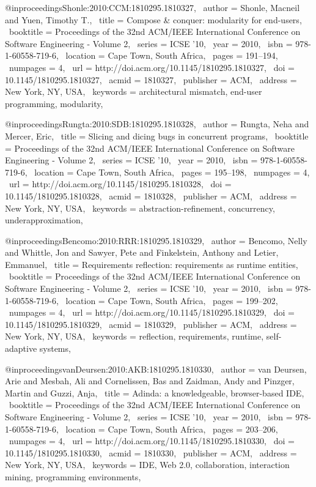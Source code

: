 @inproceedings{Shonle:2010:CCM:1810295.1810327,
 author = {Shonle, Macneil and Yuen, Timothy T.},
 title = {Compose \& conquer: modularity for end-users},
 booktitle = {Proceedings of the 32nd ACM/IEEE International Conference on Software Engineering - Volume 2},
 series = {ICSE '10},
 year = {2010},
 isbn = {978-1-60558-719-6},
 location = {Cape Town, South Africa},
 pages = {191--194},
 numpages = {4},
 url = {http://doi.acm.org/10.1145/1810295.1810327},
 doi = {10.1145/1810295.1810327},
 acmid = {1810327},
 publisher = {ACM},
 address = {New York, NY, USA},
 keywords = {architectural mismatch, end-user programming, modularity},
} 

@inproceedings{Rungta:2010:SDB:1810295.1810328,
 author = {Rungta, Neha and Mercer, Eric},
 title = {Slicing and dicing bugs in concurrent programs},
 booktitle = {Proceedings of the 32nd ACM/IEEE International Conference on Software Engineering - Volume 2},
 series = {ICSE '10},
 year = {2010},
 isbn = {978-1-60558-719-6},
 location = {Cape Town, South Africa},
 pages = {195--198},
 numpages = {4},
 url = {http://doi.acm.org/10.1145/1810295.1810328},
 doi = {10.1145/1810295.1810328},
 acmid = {1810328},
 publisher = {ACM},
 address = {New York, NY, USA},
 keywords = {abstraction-refinement, concurrency, underapproximation},
} 

@inproceedings{Bencomo:2010:RRR:1810295.1810329,
 author = {Bencomo, Nelly and Whittle, Jon and Sawyer, Pete and Finkelstein, Anthony and Letier, Emmanuel},
 title = {Requirements reflection: requirements as runtime entities},
 booktitle = {Proceedings of the 32nd ACM/IEEE International Conference on Software Engineering - Volume 2},
 series = {ICSE '10},
 year = {2010},
 isbn = {978-1-60558-719-6},
 location = {Cape Town, South Africa},
 pages = {199--202},
 numpages = {4},
 url = {http://doi.acm.org/10.1145/1810295.1810329},
 doi = {10.1145/1810295.1810329},
 acmid = {1810329},
 publisher = {ACM},
 address = {New York, NY, USA},
 keywords = {reflection, requirements, runtime, self-adaptive systems},
} 

@inproceedings{vanDeursen:2010:AKB:1810295.1810330,
 author = {van Deursen, Arie and Mesbah, Ali and Cornelissen, Bas and Zaidman, Andy and Pinzger, Martin and Guzzi, Anja},
 title = {Adinda: a knowledgeable, browser-based IDE},
 booktitle = {Proceedings of the 32nd ACM/IEEE International Conference on Software Engineering - Volume 2},
 series = {ICSE '10},
 year = {2010},
 isbn = {978-1-60558-719-6},
 location = {Cape Town, South Africa},
 pages = {203--206},
 numpages = {4},
 url = {http://doi.acm.org/10.1145/1810295.1810330},
 doi = {10.1145/1810295.1810330},
 acmid = {1810330},
 publisher = {ACM},
 address = {New York, NY, USA},
 keywords = {IDE, Web 2.0, collaboration, interaction mining, programming environments},
} 

